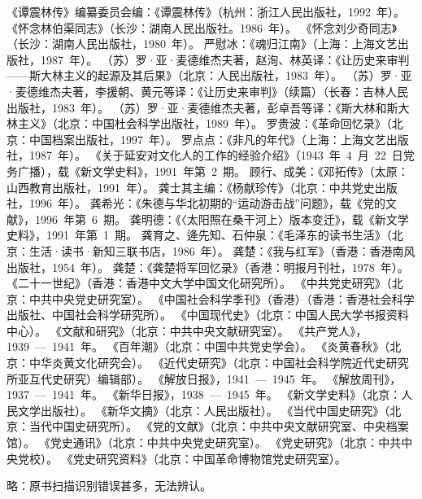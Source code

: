\begin{thebibliography}{999}
\bibitem{}《谭震林传》编纂委员会编：《谭震林传》（杭州：浙江人民出版社，1992~年）。
\bibitem{}《怀念林伯渠同志》（长沙：湖南人民出版社。1986~年）。
\bibitem{}《怀念刘少奇同志》（长沙：湖南人民出版社，1980~年）。
\bibitem{}严慰冰：《魂归江南》（上海：上海文艺出版社，1987~年）。
\bibitem{}（苏）罗·亚·麦德维杰夫著，赵洵、林英译：《让历史来审判——斯大林主义的起源及其后果》（北京：人民出版社，1983~年）。
\bibitem{}（苏）罗·亚·麦德维杰夫著，李援朝、黄元等译：《让历史来审判》（续篇）（长春：吉林人民出版社，1983~年）。
\bibitem{}（苏）罗·亚·麦德维杰夫著，彭卓吾等译：《斯大林和斯大林主义》（北京：中国杜会科学出版社，1989~年）。
\bibitem{}罗贵波：《革命回忆录》（北京：中国档案出版社，1997~年）。
\bibitem{}罗点点：《非凡的年代》（上海：上海文艺出版社，1987~年）。
\bibitem{}《关于延安对文化人的工作的经验介绍》（1943~年~4~月~22~日党务广播），载《新文学史料》，1991~年第~2~期。
\bibitem{}顾行、成美：《邓拓传》（太原：山西教育出版社，1991~年）。
\bibitem{}龚士其主编：《杨献珍传》（北京：中共党史出版社，1996~年）。
\bibitem{}龚希光：《朱德与华北初期的“运动游击战”问题》，载《党的文献》，1996~年第~6~期。
\bibitem{}龚明德：《〈太阳照在桑干河上〉版本变迁》，载《新文学史料》，1991~年第~1~期。
\bibitem{}龚育之、逄先知、石仲泉：《毛泽东的读书生活》（北京：生活·读书·新知三联书店，1986~年）。
\bibitem{}龚楚：《我与红军》（香港：香港南风出版社，1954~年）。
\bibitem{}龚楚：《龚楚将军回忆录》（香港：明报月刊社，1978~年）。
\bibitem{}《二十一世纪》（香港：香港中文大学中国文化研究所）。
\bibitem{}《中共党史研究》（北京：中共中央党史研究室）。
\bibitem{}《中国社会科学季刊》（香港）（香港：香港社会科学出版社、中国社会科学研究所）。
\bibitem{}《中国现代史》（北京：中国人民大学书报资料中心）。
\bibitem{}《文献和研究》（北京：中共中央文献研究室）。
\bibitem{}《共产党人》，1939~—~1941~年。
\bibitem{}《百年潮》（北京：中国中共党史学会）。
\bibitem{}《炎黄春秋》（北京：中华炎黄文化研究会）。
\bibitem{}《近代史研究》（北京：中国社会科学院近代史研究所亚互代史研究）编辑部）。
\bibitem{}《解放日报》，1941~—~1945~年。
\bibitem{}《解放周刊》，1937~—~1941~年。
\bibitem{}《新华日报》，1938~—~1945~年。
\bibitem{}《新文学史料》（北京：人民文学出版社）。
\bibitem{}《新华文摘》（北京：人民出版社）。
\bibitem{}《当代中国史研究》（北京：当代中国史研究所）。
\bibitem{}《党的文献》（北京：中共中央文献研究室、中央档案馆）。
\bibitem{}《党史通讯》（北京：中共中央党史研究室）。
\bibitem{}《党史研究》（北京：中共中央党校）。
\bibitem{}《党史研究资料》（北京：中国革命博物馆党史研究室）。
\item[]\kaishu 略：原书扫描识别错误甚多，无法辨认。
\end{thebibliography}